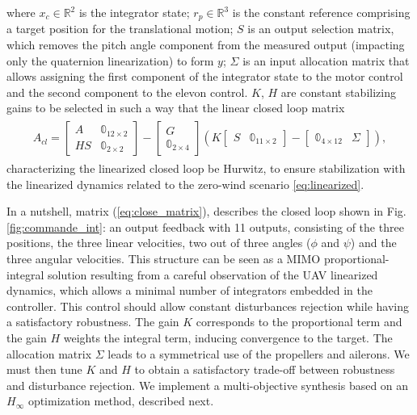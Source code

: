 where $x_{c} \in \mathbb{R}^{2}$ is the integrator state; $r_{p} \in \mathbb{R}^{3}$ is the constant reference comprising a target position for the translational motion; $S$ is an output selection matrix, which removes the pitch angle component from the measured output (impacting only the quaternion linearization) to form $y$; $\Sigma$ is an input allocation matrix that allows assigning the first component of the integrator state to the motor control and the second component to the elevon control. $K$, $H$ are constant stabilizing gains to be selected in such a way that the linear closed loop matrix 
\begin{align} \label{eq:close_matrix}
    \begin{gathered}
        A_{cl} \!= \!
        \begin{bmatrix}A & \mathbb{0}_{12\times 2} \\ HS & \mathbb{0}_{2\times 2}\end{bmatrix} \!- \!\begin{bmatrix}G \\ \mathbb{0}_{2\times 4}\end{bmatrix} \left( K \begin{bmatrix}S & \mathbb{0}_{11\times 2}\end{bmatrix} -  \begin{bmatrix}\mathbb{0}_{4\times 12} & \Sigma \end{bmatrix}\right),
    \end{gathered}
\end{align}
characterizing the linearized closed loop be Hurwitz, to ensure stabilization with the linearized dynamics related to the zero-wind scenario \eqref{eq:linearized}.

In a nutshell, matrix (\ref{eq:close_matrix}), describes the closed loop shown in Fig. \ref{fig:commande_int}: an output feedback with 11 outputs, consisting of the three positions, the three linear velocities, two out of three angles ($\phi$ and $\psi$) and the three angular velocities. This structure can be seen as a MIMO proportional-integral solution resulting from a careful observation of the UAV linearized dynamics, which allows a minimal number of integrators embedded in the controller. This control should allow constant disturbances rejection while having a satisfactory robustness. The gain $K$ corresponds to the proportional  term and the gain $H$ weights the integral term, inducing convergence to the target. The allocation matrix $\Sigma$ leads to a symmetrical use of the propellers and ailerons. We must then tune $K$ and $H$ to obtain a satisfactory trade-off between robustness and disturbance rejection. We implement a multi-objective synthesis based on an $H_{\infty}$ optimization method, described next.

